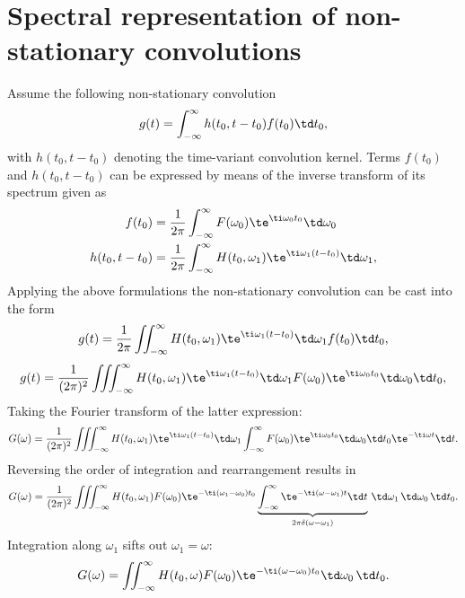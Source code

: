 \section{Spectral representation of non-stationary convolutions}
\label{Sec:Non_stat_conv}

Assume the following non-stationary convolution
\begin{equation}
g(t) = \int_{-\infty}^{\infty} h(t_0,t-t_0) f(t_0) \td t_0,
\label{Eq:App:Non_stat_conv_td}
\end{equation}
with $h(t_0,t-t_0)$ denoting the time-variant convolution kernel.
Terms $f(t_0)$ and $h(t_0,t-t_0)$ can be expressed by means of the inverse transform of its spectrum given as
\begin{align}
f(t_0) &= \frac{1}{2\pi} \int_{-\infty}^{\infty} F(\omega_0) \te^{\ti \omega_0 t_0}\td \omega_0
\\
h(t_0,t-t_0) &= \frac{1}{2\pi}\int_{-\infty}^{\infty} H(t_0,\omega_1) \te^{\ti \omega_1(t-t_0)} \td \omega_1,
\end{align}
Applying the above formulations the non-stationary convolution can be cast into the form
\begin{equation}
g(t) = \frac{1}{2\pi} \iint_{-\infty}^{\infty}  H(t_0,\omega_1) \te^{\ti \omega_1(t-t_0)} \td \omega_1 f(t_0) \td t_0,
\end{equation}
\begin{equation}
g(t) = \frac{1}{(2\pi)^2} \iiint_{-\infty}^{\infty}  H(t_0,\omega_1) \te^{\ti \omega_1(t-t_0)} \td \omega_1  F(\omega_0) \te^{\ti \omega_0 t_0}\td \omega_0 \td t_0,
\end{equation}
Taking the Fourier transform of the latter expression:
\begin{equation}
G(\omega) =\frac{1}{(2\pi)^2} \iiint_{-\infty}^{\infty} H(t_0,\omega_1) \te^{\ti \omega_1(t-t_0)} \td \omega_1 \int_{-\infty}^{\infty} F(\omega_0) \te^{\ti \omega_0 t_0}\td \omega_0 \td t_0 \te^{-\ti \omega t} \td t.
\end{equation}
Reversing the order of integration and rearrangement results in
\begin{equation}
G(\omega) =\frac{1}{(2\pi)^2} \iiint_{-\infty}^{\infty} H(t_0,\omega_1) F(\omega_0)  \te^{-\ti (\omega_1-\omega_0) t_0}  
\underbrace{ \int_{-\infty}^{\infty}  \te^{-\ti (\omega-\omega_1) t}  \td t}_{2\pi \delta(\omega-\omega_1)}
 \, \td \omega_1 \,  \td \omega_0 \, \td t_0.
\end{equation}
Integration along $\omega_1$ sifts out $\omega_1 = \omega$:
\begin{equation}
G(\omega) =  \iint_{-\infty}^{\infty} H(t_0,\omega) F(\omega_0)  \te^{-\ti (\omega-\omega_0) t_0}   \td \omega_0 \, \td t_0.
\end{equation}
